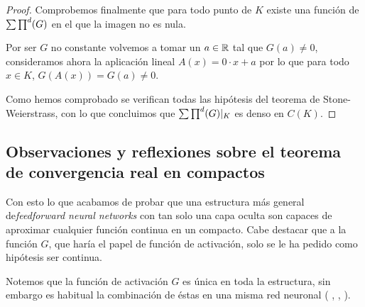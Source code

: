 \begin{proof}
    Comprobemos finalmente que para todo punto de $K$ existe una función de $\sum \prod^d (G)$  en el que la imagen no es nula.  

    Por ser $G$ no constante volvemos a tomar un $a \in \mathbb{R}$ tal que $G(a) \neq 0$, consideramos ahora la aplicación lineal
    $A(x) = 0 \cdot x + a$ por lo que para todo $x \in K$, $G(A(x)) = G(a) \neq 0$. 

    Como hemos comprobado se verifican todas las hipótesis del teorema de Stone-Weierstrass, con lo que concluimos que $\sum \prod^d (G) |_K$ es denso en $C(K)$. 
\end{proof}

\subsection{Observaciones y reflexiones sobre el teorema de convergencia real en compactos}

Con esto lo que acabamos de probar que una estructura más general de\textit{feedforward neural networks} con tan solo una capa oculta  son capaces de aproximar cualquier 
función continua en un compacto.  Cabe destacar que a la función $G$, que haría el papel de función de activación,
 solo se le ha pedido como 
hipótesis ser continua.     


Notemos que la función de activación $G$ es única en toda la estructura,
sin embargo es habitual la combinación de éstas en una misma red neuronal (
\cite{DBLP:journals/corr/abs-1811-03378}, 
 \cite{8258768}, 
 \cite{DBLP:journals/corr/SzegedyVISW15}
). 
\reversemarginpar
{}
\normalmarginpar

